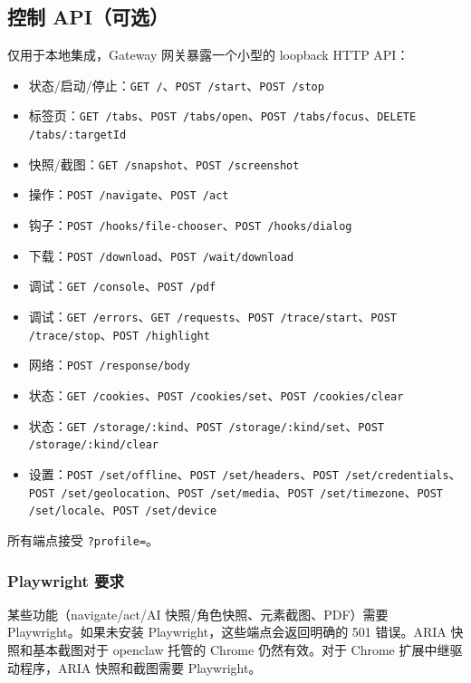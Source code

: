 \subsection{控制 API（可选）}


仅用于本地集成，Gateway 网关暴露一个小型的 loopback HTTP API：

\begin{itemize}
  \item 状态/启动/停止：\texttt{GET /}、\texttt{POST /start}、\texttt{POST /stop}
  \item 标签页：\texttt{GET /tabs}、\texttt{POST /tabs/open}、\texttt{POST /tabs/focus}、\texttt{DELETE /tabs/:targetId}
  \item 快照/截图：\texttt{GET /snapshot}、\texttt{POST /screenshot}
  \item 操作：\texttt{POST /navigate}、\texttt{POST /act}
  \item 钩子：\texttt{POST /hooks/file-chooser}、\texttt{POST /hooks/dialog}
  \item 下载：\texttt{POST /download}、\texttt{POST /wait/download}
  \item 调试：\texttt{GET /console}、\texttt{POST /pdf}
  \item 调试：\texttt{GET /errors}、\texttt{GET /requests}、\texttt{POST /trace/start}、\texttt{POST /trace/stop}、\texttt{POST /highlight}
  \item 网络：\texttt{POST /response/body}
  \item 状态：\texttt{GET /cookies}、\texttt{POST /cookies/set}、\texttt{POST /cookies/clear}
  \item 状态：\texttt{GET /storage/:kind}、\texttt{POST /storage/:kind/set}、\texttt{POST /storage/:kind/clear}
  \item 设置：\texttt{POST /set/offline}、\texttt{POST /set/headers}、\texttt{POST /set/credentials}、\texttt{POST /set/geolocation}、\texttt{POST /set/media}、\texttt{POST /set/timezone}、\texttt{POST /set/locale}、\texttt{POST /set/device}
\end{itemize}


所有端点接受 \texttt{?profile=}。

\subsubsection{Playwright 要求}


某些功能（navigate/act/AI 快照/角色快照、元素截图、PDF）需要 Playwright。如果未安装 Playwright，这些端点会返回明确的 501 错误。ARIA 快照和基本截图对于 openclaw 托管的 Chrome 仍然有效。对于 Chrome 扩展中继驱动程序，ARIA 快照和截图需要 Playwright。

